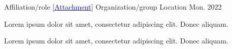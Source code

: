 
\newcommand{\linkA}{
    \href{Hlink}%
    {[\textcolor{blue}{Attachment}}]
    }

\begin{cventries}

  \cventry
    {Affiliation/role  \linkA} %
    {Organization/group} %
    {Location} %
    {Mon. 2022} %
    {
      \begin{cvitems} %
        \item {Lorem ipsum dolor sit amet, consectetur adipiscing elit. Donec aliquam.}
        \item {Lorem ipsum dolor sit amet, consectetur adipiscing elit. Donec aliquam.}
      \end{cvitems}
    }


\end{cventries}
